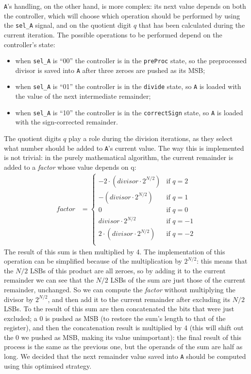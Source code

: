 \texttt{A}'s handling, on the other hand, is more complex: its next value depends on both the controller, which will choose which operation should be performed by using the \texttt{sel\_A} signal, and on the quotient digit $q$ that has been calculated during the current iteration.
The possible operations to be performed depend on the controller's state:
\begin{itemize}
    \item when \texttt{sel\_A} is \enquote{00} the controller is in the \texttt{preProc} state, so the preprocessed divisor is saved into \texttt{A} after three zeroes are pushed as its MSB;
    \item when \texttt{sel\_A} is \enquote{01} the controller is in the \texttt{divide} state, so \texttt{A} is loaded with the value of the next intermediate remainder;
    \item when \texttt{sel\_A} is \enquote{10} the controller is in the \texttt{correctSign} state, so \texttt{A} is loaded with the sign-corrected remainder.
\end{itemize}
The quotient digits $q$ play a role during the division iterations, as they select what number should be added to \texttt{A}'s current value. 
The way this is implemented is not trivial: in the purely mathematical algorithm, the current remainder is added to a \textit{factor} whose value depends on q:
\begin{align*}
    factor &=
    \begin{cases}
      -2 \cdot (divisor \cdot 2^{N/2}) & \text{if $q = 2$}\\
      -(divisor \cdot 2^{N/2}) & \text{if $q = 1$}\\
      0 & \text{if $q = 0$}\\
      divisor \cdot 2^{N/2} & \text{if $q = -1$}\\
      2 \cdot (divisor \cdot 2^{N/2}) & \text{if $q = -2$}\\
      \end{cases}
\end{align*}
The result of this sum is then multiplied by 4.
The implementation of this operation can be simplified because of the multiplication by $2^{N/2}$: this means that the $N/2$ LSBs of this product are all zeroes, so by adding it to the current remainder we can see that the $N/2$ LSBs of the sum are just those of the current remainder, unchanged.
So we can compute the \textit{factor} without multiplying the divisor by $2^{N/2}$, and then add it to the current remainder after excluding its $N/2$ LSBs.
To the result of this sum are then concatenated the bits that were just excluded; a 0 is pushed as MSB (to restore the sum's length to that of the register), and then the concatenation result is multiplied by 4 (this will shift out the 0 we pushed as MSB, making its value unimportant): the final result of this process is the same as the previous one, but the operands of the sum are half as long.
We decided that the next remainder value saved into \texttt{A} should be computed using this optimised strategy.

